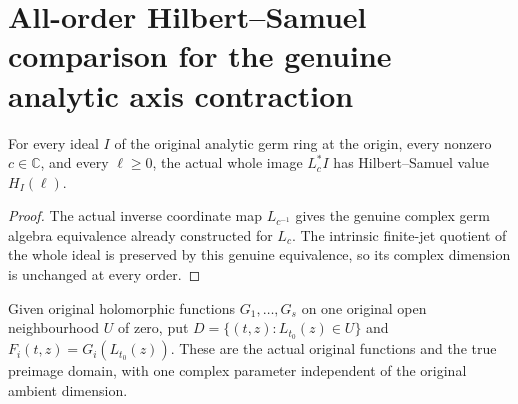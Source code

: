 \section{All-order Hilbert--Samuel comparison for the genuine analytic axis contraction}

\begin{theorem}
\label{hir:actual-axis-nonzero-hs}
\leanok
For every ideal $I$ of the original analytic germ ring at the origin, every
nonzero $c\in\mathbb C$, and every $\ell\ge0$, the actual whole image
$L_c^*I$ has Hilbert--Samuel value $H_I(\ell)$.
\end{theorem}
\begin{proof}
The actual inverse coordinate map $L_{c^{-1}}$ gives the genuine complex
germ algebra equivalence already constructed for $L_c$. The intrinsic
finite-jet quotient of the whole ideal is preserved by this genuine
equivalence, so its complex dimension is unchanged at every order.
\end{proof}

\begin{definition}
\label{hir:actual-axis-family-domain}
\leanok
Given original holomorphic functions $G_1,\ldots,G_s$ on one original open
neighbourhood $U$ of zero, put
$D=\{(t,z):L_{t_0}(z)\in U\}$ and
$F_i(t,z)=G_i(L_{t_0}(z))$. These are the actual original functions and
the true preimage domain, with one complex parameter independent of the
original ambient dimension.
\end{definition}

